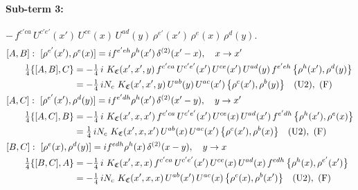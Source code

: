 \documentclass[10pt]{article}
\numberwithin{equation}{section}
\begin{document}
\paragraph{Sub-term 3:} $-\,f^{c'ca}\,U^{c'e'}(x')\,U^{ce}(x)\,U^{ad}(y)\,\rho^{e'}(x')\,\rho^{e}(x)\,\rho^{d}(y)$.
\begin{align}
&[A,B]:\ [\rho^{e'}(x'),\rho^{e}(x)]=i f^{e'eh}\rho^{h}(x')\,\delta^{(2)}(x'-x),\quad x\to x'\notag\\
&\qquad \tfrac14\{[A,B],C\}=-\tfrac14\,i\,\,K_{\mathfrak C}(x',x',y)\,f^{c'ca}\,U^{c'e'}(x')\,U^{ce}(x')\,U^{ad}(y)\,f^{e'eh}\,\big\{\rho^{h}(x'),\rho^{d}(y)\big\}\notag\\
&\qquad\phantom{\tfrac14\{[A,B],C\}}=-\tfrac14\,i N_{c}\,\,K_{\mathfrak C}(x',x',y)\,U^{ab}(y)\,U^{ac}(x')\,\big\{\rho^{c}(x'),\rho^{b}(y)\big\}\quad\text{(U2)},\ \text{(F)}
\label{eq:GIII.V-3-AB}\\
&[A,C]:\ [\rho^{e'}(x'),\rho^{d}(y)]=i f^{e'dh}\rho^{h}(x')\,\delta^{(2)}(x'-y),\quad y\to x'\notag\\
&\qquad \tfrac14\{[A,C],B\}=-\tfrac14\,i\,\,K_{\mathfrak C}(x',x,x')\,f^{c'ca}\,U^{c'e'}(x')\,U^{ce}(x)\,U^{ad}(x')\,f^{e'dh}\,\big\{\rho^{h}(x'),\rho^{e}(x)\big\}\notag\\
&\qquad\phantom{\tfrac14\{[A,C],B\}}=\tfrac14\,i N_{c}\,\,K_{\mathfrak C}(x',x,x')\,U^{ab}(x)\,U^{ac}(x')\,\big\{\rho^{c}(x'),\rho^{b}(x)\big\}\quad\text{(U2)},\ \text{(F)}
\label{eq:GIII.V-3-AC}\\
&[B,C]:\ [\rho^{e}(x),\rho^{d}(y)]=i f^{edh}\rho^{h}(x)\,\delta^{(2)}(x-y),\quad y\to x\notag\\
&\qquad \tfrac14\{[B,C],A\}=-\tfrac14\,i\,\,K_{\mathfrak C}(x',x,x)\,f^{c'ca}\,U^{c'e'}(x')\,U^{ce}(x)\,U^{ad}(x)\,f^{edh}\,\big\{\rho^{h}(x),\rho^{e'}(x')\big\}\notag\\
&\qquad\phantom{\tfrac14\{[B,C],A\}}=-\tfrac14\,i N_{c}\,\,K_{\mathfrak C}(x',x,x)\,U^{ab}(x')\,U^{ac}(x)\,\big\{\rho^{c}(x),\rho^{b}(x')\big\}\quad\text{(U2)},\ \text{(F)}
\label{eq:GIII.V-3-BC}
\end{align}
\end{document}

